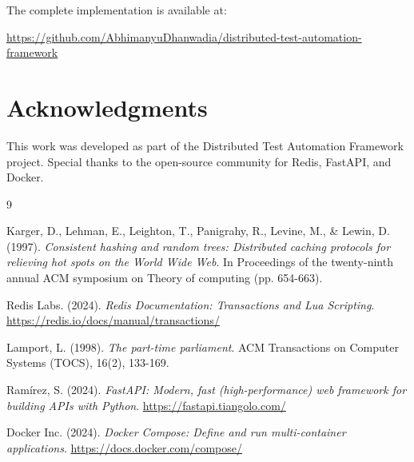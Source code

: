 \documentclass[11pt,a4paper]{article}
\begin{document}
The complete implementation is available at:
\begin{center}
\url{https://github.com/AbhimanyuDhanwadia/distributed-test-automation-framework}
\end{center}

\section*{Acknowledgments}

This work was developed as part of the Distributed Test Automation Framework project. Special thanks to the open-source community for Redis, FastAPI, and Docker.

\begin{thebibliography}{9}

Karger, D., Lehman, E., Leighton, T., Panigrahy, R., Levine, M., \& Lewin, D. (1997).
\textit{Consistent hashing and random trees: Distributed caching protocols for relieving hot spots on the World Wide Web}.
In Proceedings of the twenty-ninth annual ACM symposium on Theory of computing (pp. 654-663).

Redis Labs. (2024).
\textit{Redis Documentation: Transactions and Lua Scripting}.
\url{https://redis.io/docs/manual/transactions/}

Lamport, L. (1998).
\textit{The part-time parliament}.
ACM Transactions on Computer Systems (TOCS), 16(2), 133-169.

Ramírez, S. (2024).
\textit{FastAPI: Modern, fast (high-performance) web framework for building APIs with Python}.
\url{https://fastapi.tiangolo.com/}

Docker Inc. (2024).
\textit{Docker Compose: Define and run multi-container applications}.
\url{https://docs.docker.com/compose/}

\end{thebibliography}
\end{document}
